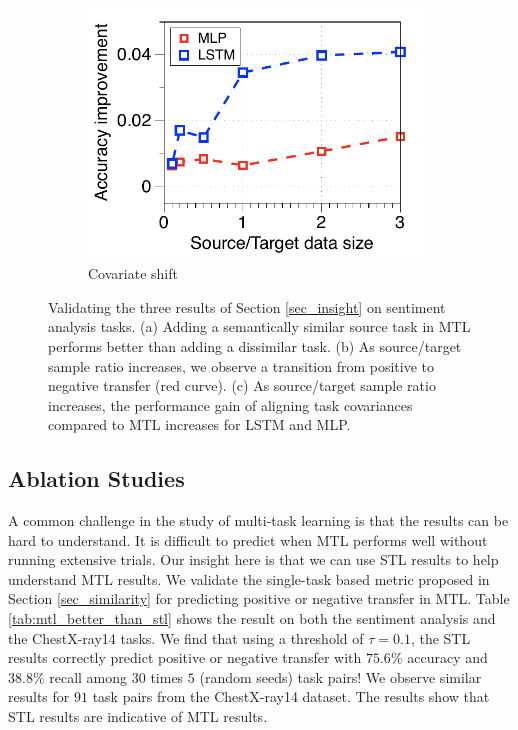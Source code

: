 \begin{figure}[!t]
\begin{subfigure}[b]{0.33\textwidth}
		\includegraphics[width=0.975\textwidth]{figures/ratio_alignment_norm_diff_all.pdf}
		\caption{Covariate shift}
		\label{fig_ab_cov}
	\end{subfigure}
	\caption{Validating the three results of Section \ref{sec_insight} on sentiment analysis tasks. (a) Adding a semantically similar source task in MTL performs better than adding a dissimilar task.
	(b) As source/target sample ratio increases, we observe a transition from positive to negative transfer (red curve).
	(c) As source/target sample ratio increases, the performance gain of aligning task covariances \cite{WZR20} compared to MTL increases for LSTM and MLP.}
	\label{fig_ablation}
	\vspace{-0.15in}
\end{figure}


\subsection{Ablation Studies}

A common challenge in the study of multi-task learning is that the results can be hard to understand.
It is difficult to predict when MTL performs well without running extensive trials.
Our insight here is that we can use STL results to help understand MTL results.
We validate the single-task based metric proposed in Section \ref{sec_similarity} for predicting positive or negative transfer in MTL.
Table \ref{tab:mtl_better_than_stl} shows the result on both the sentiment analysis and the ChestX-ray14 tasks.
We find that using a threshold of $\tau = 0.1$, the STL results correctly predict positive or negative transfer with $75.6\%$ accuracy and $38.8\%$ recall among $30$ times $5$ (random seeds) task pairs!
We observe similar results for $91$ task pairs from the ChestX-ray14 dataset.
The results show that STL results are indicative of MTL results.


